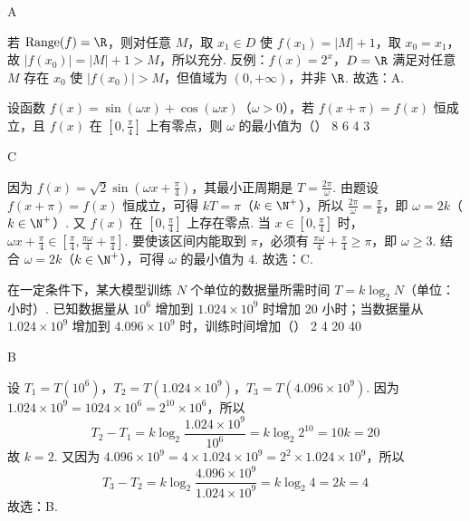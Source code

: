 \begin{answer}
A
\end{answer}

\begin{solution}
若 \(\mathrm{Range}(f)=\R\)，则对任意 \(M\)，取 \(x_1\in D\) 使 \(f(x_1)=|M|+1\)，取 \(x_0=x_1\)，故 \(|f(x_0)|=|M|+1>M\)，所以充分. 反例：\(f(x)=2^x\)，\(D=\R\) 满足对任意 \(M\) 存在 \(x_0\) 使 \(|f(x_0)|>M\)，但值域为 \((0,+\infty)\)，并非 \(\R\). 故选：A.
\end{solution}

\begin{problem}
设函数 \(f(x)=\sin(\omega x)+\cos(\omega x)\)（\(\omega>0\)），若 \(f(x+\pi)=f(x)\) 恒成立，且 \(f(x)\) 在 \(\left[0,\frac{\pi}{4}\right]\) 上有零点，则 \(\omega\) 的最小值为（\quad）
\choices
    {8}
    {6}
    {4}
    {3}
\end{problem}

\begin{answer}
C
\end{answer}

\begin{solution}
因为 \(f(x)=\sqrt{2}\sin\left(\omega x+\frac{\pi}{4}\right)\)，其最小正周期是 \(T=\frac{2\pi}{\omega}\).
由题设 \(f(x+\pi)=f(x)\) 恒成立，可得 \(kT=\pi\)（\(k\in\N^+\)），所以 \(\frac{2\pi}{\omega}=\frac{\pi}{k}\)，即 \(\omega=2k\)（\(k\in\N^+\)）.
又 \(f(x)\) 在 \(\left[0,\frac{\pi}{4}\right]\) 上存在零点. 当 \(x\in\left[0,\frac{\pi}{4}\right]\) 时，\(\omega x+\frac{\pi}{4}\in\left[\frac{\pi}{4},\frac{\pi\omega}{4}+\frac{\pi}{4}\right]\). 要使该区间内能取到 \(\pi\)，必须有 \(\frac{\pi\omega}{4}+\frac{\pi}{4}\ge\pi\)，即 \(\omega\ge3\).
结合 \(\omega=2k\)（\(k\in\N^+\)），可得 \(\omega\) 的最小值为 \(4\). 故选：C.
\end{solution}

\begin{problem}
在一定条件下，某大模型训练 \(N\) 个单位的数据量所需时间 \(T=k\log_2 N\)（单位：小时）. 已知数据量从 \(10^6\) 增加到 \(1.024\times10^9\) 时增加 \(20\) 小时；当数据量从 \(1.024\times10^9\) 增加到 \(4.096\times10^9\) 时，训练时间增加（\quad）
\choices
    {2}
    {4}
    {20}
    {40}
\end{problem}

\begin{answer}
B
\end{answer}

\begin{solution}
设 \(T_1=T(10^6)\)，\(T_2=T(1.024\times10^9)\)，\(T_3=T(4.096\times10^9)\). 因为 \(1.024\times10^9=1024\times10^6=2^{10}\times10^6\)，所以
\[
T_2-T_1=k\log_2 \frac{1.024\times10^9}{10^6}=k\log_2 2^{10}=10k=20
\]
故 \(k=2\). 又因为 \(4.096\times10^9=4\times1.024\times10^9=2^2\times1.024\times10^9\)，所以
\[
T_3-T_2=k\log_2 \frac{4.096\times10^9}{1.024\times10^9}=k\log_2 4=2k=4
\]
故选：B.
\end{solution}

